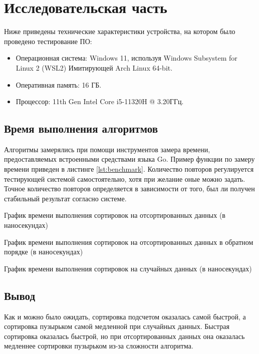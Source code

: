 \chapter{Исследовательская часть}
Ниже приведены технические характеристики устройства, на котором было проведено тестирование ПО:

\begin{itemize}
    \item Операционная система: Windows 11, используя Windows Subsystem for Linux 2 (WSL2)\cite{wsl2} Имитирующей Arch Linux\cite{arch} 64-bit.
    \item Оперативная память: 16 ГБ.
    \item Процессор: 11th Gen Intel\textsuperscript{\tiny\textregistered} Core\textsuperscript{\tiny\texttrademark} i5-11320H @ 3.20ГГц\cite{i5}.
\end{itemize}

\section{Время выполнения алгоритмов}
Алгоритмы замерялись при помощи инструментов замера времени, предоставляемых встроенными средствами языка Go\cite{go}.
Пример функции по замеру времени приведен в листинге \ref{lst:benchmark}.
Количество повторов регулируется тестирующей системой самостоятельно, хотя при желание оные можно задать.
Точное количество повторов определяется в зависимости от того, был ли получен стабильный результат согласно системе.



График времени выполнения сортировок на отсортированных данных (в наносекундах)\newline
%

График времени выполнения сортировок на отсортированных данных в обратном порядке (в наносекундах)\newline
%

\newpage
График времени выполнения сортировок на случайных данных (в наносекундах)\newline

\section*{Вывод}

Как и можно было ожидать, сортировка подсчетом оказалась самой быстрой, а сортировка пузырьком самой медленной при случайных данных.
Быстрая сортировка оказалась быстрой, но при отсортированных данных она оказалась медленнее сортировки пузырьком из-за сложности алгоритма.
